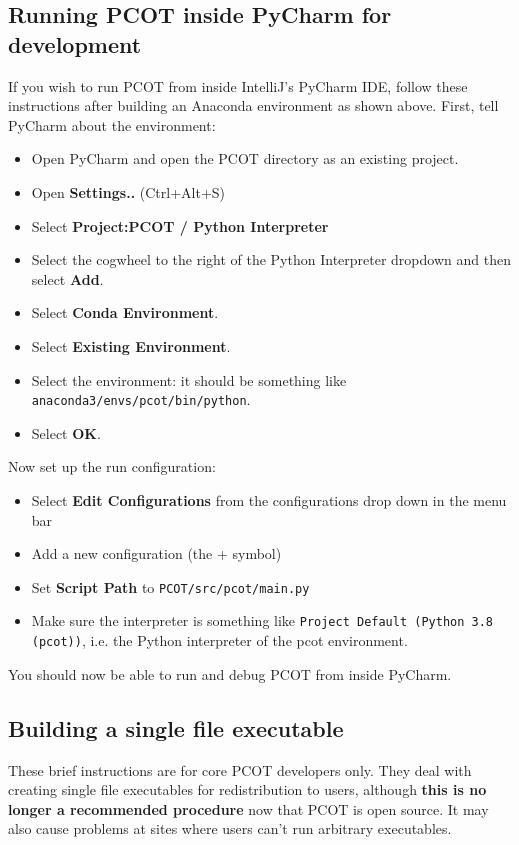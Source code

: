 \subsection{Running PCOT inside PyCharm for development}
If you wish to run PCOT from inside IntelliJ's PyCharm IDE, follow these instructions after building an Anaconda environment as shown
above. First, tell PyCharm about the environment:
\begin{itemize}
\item Open PyCharm and open the PCOT directory as an existing project.
\item Open \textbf{Settings..} (Ctrl+Alt+S)
\item Select \textbf{Project:PCOT / Python Interpreter}
\item Select the cogwheel to the right of the Python Interpreter dropdown and then select \textbf{Add}.
\item Select \textbf{Conda Environment}.
\item Select \textbf{Existing Environment}.
\item Select the environment: it should be something like \texttt{anaconda3/envs/pcot/bin/python}.
\item Select \textbf{OK}.
\end{itemize}
Now set up the run configuration:
\begin{itemize}
\item Select \textbf{Edit Configurations} from the configurations drop down in the menu bar
\item Add a new configuration (the + symbol)
\item Set \textbf{Script Path} to \texttt{PCOT/src/pcot/main.py}
\item Make sure the interpreter is something like \texttt{Project Default (Python 3.8 (pcot))},
i.e. the Python interpreter of the pcot environment.
\end{itemize}
You should now be able to run and debug PCOT from inside PyCharm.

\subsection{Building a single file executable}
These brief instructions are for core PCOT developers only. They deal with creating single file executables for redistribution to users, although
\textbf{this is no longer a recommended procedure} now that PCOT is open
source. It may also cause problems at sites where users can't run
arbitrary executables.

